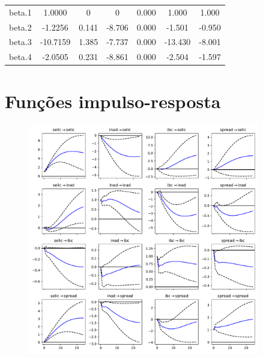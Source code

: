 \documentclass[a4paper,
               article,
               12pt,
               openany,
               oneside,
               english,
               brazil]{abntex2}
\numberwithin{equation}{section}
\begin{document}
\begin{longtable}{lcccccc}
    \midrule
    beta.1 &       1.0000  &            0     &         0  &         0.000        &        1.000    &        1.000     \\
    beta.2 &      -1.2256  &        0.141     &    -8.706  &         0.000        &       -1.501    &       -0.950     \\
    beta.3 &     -10.7159  &        1.385     &    -7.737  &         0.000        &      -13.430    &       -8.001     \\
    beta.4 &      -2.0505  &        0.231     &    -8.861  &         0.000        &       -2.504    &       -1.597     \\
\end{longtable}

\clearpage

\chapter{Funções impulso-resposta}
\begin{figure}[h]
    \centering
    \includegraphics[width = 0.9\textwidth, scale=1]{irf/irf_completo.pdf}
\end{figure}

\clearpage
\end{document}
